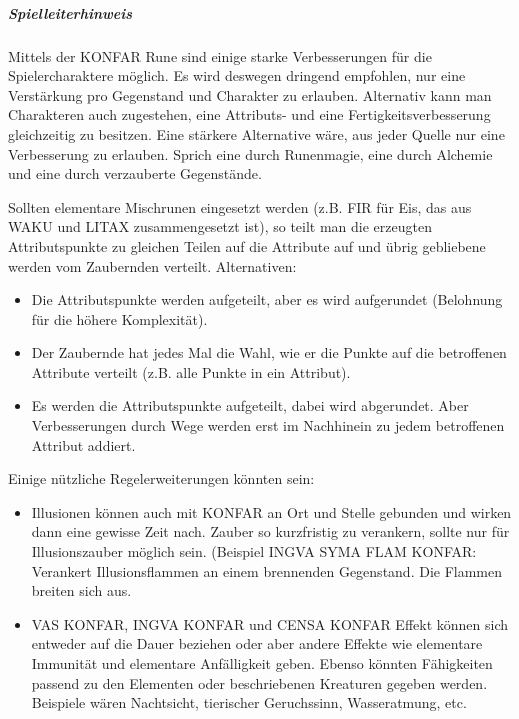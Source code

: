 \documentclass{article}
\begin{document}
\begin{mdframed}[hidealllines=true, backgroundcolor=black!10]
\subparagraph{Spielleiterhinweis}

Mittels der KONFAR Rune sind einige starke Verbesserungen für die Spielercharaktere möglich. Es wird deswegen
dringend empfohlen, nur eine Verstärkung pro Gegenstand und Charakter zu erlauben. Alternativ kann man Charakteren
auch zugestehen, eine Attributs- und eine Fertigkeitsverbesserung gleichzeitig zu besitzen. Eine stärkere Alternative
wäre, aus jeder Quelle nur eine Verbesserung zu erlauben. Sprich eine durch Runenmagie, eine durch Alchemie und eine
durch verzauberte Gegenstände.

Sollten elementare Mischrunen eingesetzt werden (z.B. FIR für Eis, das aus WAKU und LITAX zusammengesetzt ist), so
teilt man die erzeugten Attributspunkte zu gleichen Teilen auf die Attribute auf und übrig gebliebene werden vom
Zaubernden verteilt. Alternativen:

\begin{itemize}
\item Die Attributspunkte werden aufgeteilt, aber es wird aufgerundet (Belohnung für die höhere Komplexität).
\item Der Zaubernde hat jedes Mal die Wahl, wie er die Punkte auf die betroffenen Attribute verteilt (z.B. alle Punkte in ein Attribut).
\item Es werden die Attributspunkte aufgeteilt, dabei wird abgerundet. Aber Verbesserungen durch Wege werden erst im Nachhinein zu jedem betroffenen Attribut addiert.
\end{itemize}

Einige nützliche Regelerweiterungen könnten sein:

\begin{itemize}
\item Illusionen können auch mit KONFAR an Ort und Stelle gebunden und wirken dann eine gewisse Zeit nach. Zauber so kurzfristig zu verankern, sollte nur für Illusionszauber möglich sein. (Beispiel INGVA SYMA FLAM KONFAR: Verankert Illusionsflammen an einem brennenden Gegenstand. Die Flammen breiten sich aus.
\item VAS KONFAR, INGVA KONFAR und CENSA KONFAR Effekt können sich entweder auf die Dauer beziehen oder aber andere Effekte wie elementare Immunität und elementare Anfälligkeit geben. Ebenso könnten Fähigkeiten passend zu den Elementen oder beschriebenen Kreaturen gegeben werden. Beispiele wären Nachtsicht, tierischer Geruchssinn, Wasseratmung, etc.
\end{itemize}

\end{mdframed}
\end{document}
